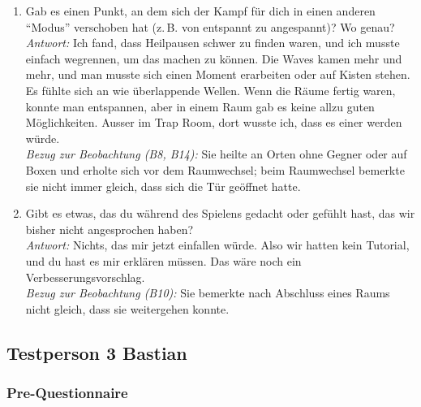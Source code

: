 \documentclass[../Main.tex]{subfiles}
\begin{document}
\begin{enumerate}[label=\textbf{I\arabic*}, leftmargin=1.5cm, itemsep=1em]
\item Gab es einen Punkt, an dem sich der Kampf für dich in einen anderen \enquote{Modus} verschoben hat (z.\,B. von entspannt zu angespannt)? Wo genau? \\
    \textit{Antwort:} Ich fand, dass Heilpausen schwer zu finden waren, und ich musste einfach wegrennen, um das machen zu können. Die Waves kamen mehr und mehr, und man musste sich einen Moment erarbeiten oder auf Kisten stehen. Es fühlte sich an wie überlappende Wellen. Wenn die Räume fertig waren, konnte man entspannen, aber in einem Raum gab es keine allzu guten Möglichkeiten. Ausser im Trap Room, dort wusste ich, dass es einer werden würde. \\
    \textit{Bezug zur Beobachtung (B8, B14):} Sie heilte an Orten ohne Gegner oder auf Boxen und erholte sich vor dem Raumwechsel; beim Raumwechsel bemerkte sie nicht immer gleich, dass sich die Tür geöffnet hatte.

\item Gibt es etwas, das du während des Spielens gedacht oder gefühlt hast, das wir bisher nicht angesprochen haben? \\
    \textit{Antwort:} Nichts, das mir jetzt einfallen würde. Also wir hatten kein Tutorial, und du hast es mir erklären müssen. Das wäre noch ein Verbesserungsvorschlag. \\
    \textit{Bezug zur Beobachtung (B10):} Sie bemerkte nach Abschluss eines Raums nicht gleich, dass sie weitergehen konnte.
\end{enumerate}

\subsection{Testperson 3 Bastian}

\subsubsection{Pre-Questionnaire}
\end{document}
